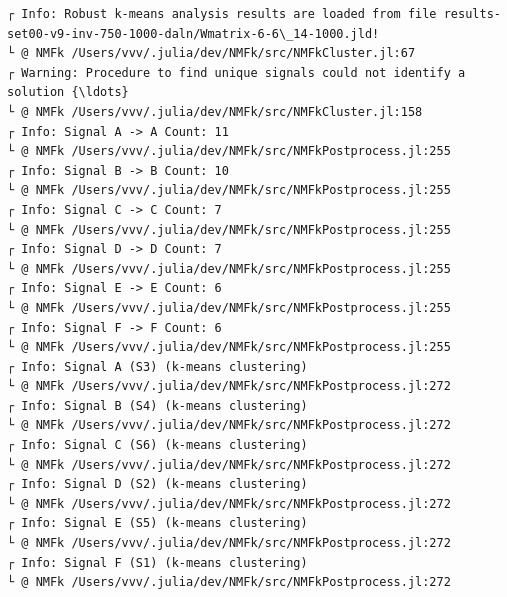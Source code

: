 \documentclass[11pt]{article}
\begin{document}
    \begin{Verbatim}[commandchars=\\\{\}]
┌ Info: Robust k-means analysis results are loaded from file results-
set00-v9-inv-750-1000-daln/Wmatrix-6-6\_14-1000.jld!
└ @ NMFk /Users/vvv/.julia/dev/NMFk/src/NMFkCluster.jl:67
┌ Warning: Procedure to find unique signals could not identify a solution {\ldots}
└ @ NMFk /Users/vvv/.julia/dev/NMFk/src/NMFkCluster.jl:158
┌ Info: Signal A -> A Count: 11
└ @ NMFk /Users/vvv/.julia/dev/NMFk/src/NMFkPostprocess.jl:255
┌ Info: Signal B -> B Count: 10
└ @ NMFk /Users/vvv/.julia/dev/NMFk/src/NMFkPostprocess.jl:255
┌ Info: Signal C -> C Count: 7
└ @ NMFk /Users/vvv/.julia/dev/NMFk/src/NMFkPostprocess.jl:255
┌ Info: Signal D -> D Count: 7
└ @ NMFk /Users/vvv/.julia/dev/NMFk/src/NMFkPostprocess.jl:255
┌ Info: Signal E -> E Count: 6
└ @ NMFk /Users/vvv/.julia/dev/NMFk/src/NMFkPostprocess.jl:255
┌ Info: Signal F -> F Count: 6
└ @ NMFk /Users/vvv/.julia/dev/NMFk/src/NMFkPostprocess.jl:255
┌ Info: Signal A (S3) (k-means clustering)
└ @ NMFk /Users/vvv/.julia/dev/NMFk/src/NMFkPostprocess.jl:272
┌ Info: Signal B (S4) (k-means clustering)
└ @ NMFk /Users/vvv/.julia/dev/NMFk/src/NMFkPostprocess.jl:272
┌ Info: Signal C (S6) (k-means clustering)
└ @ NMFk /Users/vvv/.julia/dev/NMFk/src/NMFkPostprocess.jl:272
┌ Info: Signal D (S2) (k-means clustering)
└ @ NMFk /Users/vvv/.julia/dev/NMFk/src/NMFkPostprocess.jl:272
┌ Info: Signal E (S5) (k-means clustering)
└ @ NMFk /Users/vvv/.julia/dev/NMFk/src/NMFkPostprocess.jl:272
┌ Info: Signal F (S1) (k-means clustering)
└ @ NMFk /Users/vvv/.julia/dev/NMFk/src/NMFkPostprocess.jl:272
    \end{Verbatim}

    \begin{center}
    \end{center}
    { \hspace*{\fill} \\}

    \begin{Verbatim}[commandchars=\\\{\}]

    \end{Verbatim}

    \begin{center}
    \end{center}
    { \hspace*{\fill} \\}
\end{document}
